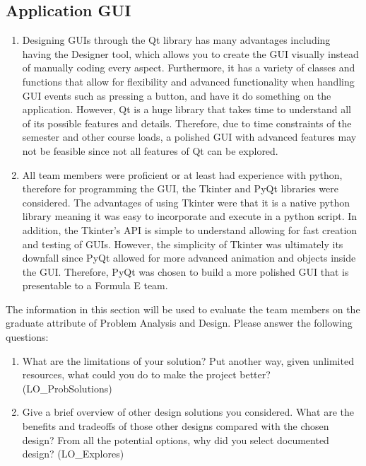 \documentclass[12pt, titlepage]{article}
\begin{document}
\subsection{Application GUI}
\begin{enumerate}
  \item Designing GUIs through the Qt library has many advantages including having the Designer tool, which allows you to create the GUI visually instead of manually coding every aspect. Furthermore, it has a variety of classes and functions that allow for flexibility and advanced functionality when handling GUI events such as pressing a button, and have it do something on the application. However, Qt is a huge library that takes time to understand all of its possible features and details. Therefore, due to time constraints of the semester and other course loads, a polished GUI with advanced features may not be feasible since not all features of Qt can be explored.
  \item All team members were proficient or at least had experience with python, therefore for programming the GUI, the Tkinter and PyQt libraries were considered. The advantages of using Tkinter were that it is a native python library meaning it was easy to incorporate and execute in a python script. In addition, the Tkinter’s API is simple to understand allowing for fast creation and testing of GUIs. However, the simplicity of Tkinter was ultimately its downfall since PyQt allowed for more advanced animation and objects inside the GUI. Therefore, PyQt was chosen to build a more polished GUI that is presentable to a Formula E team.
\end{enumerate}













The information in this section will be used to evaluate the team members on the
graduate attribute of Problem Analysis and Design.  Please answer the following questions:

\begin{enumerate}
  \item What are the limitations of your solution?  Put another way, given
  unlimited resources, what could you do to make the project better? (LO\_ProbSolutions)
  \item Give a brief overview of other design solutions you considered.  What
  are the benefits and tradeoffs of those other designs compared with the chosen
  design?  From all the potential options, why did you select documented design?
  (LO\_Explores)
\end{enumerate}
\end{document}
